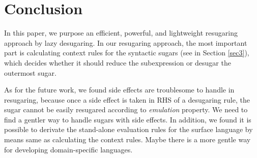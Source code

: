 \section{Conclusion}
\label{sec7}


In this paper, we purpose an efficient, powerful, and lightweight resugaring approach by lazy desugaring.
In our resugaring approach, the most important part is calculating context rules for the syntactic sugars (see in Section \ref{sec3}), which decides whether it should reduce the subexpression or desugar the outermost sugar.



As for the future work, we found side effects are troublesome to handle in resugaring, because once a side effect is taken in RHS of a desugaring rule, the sugar cannot be easily resugared according to \emph{emulation} property. We need to find a gentler way to handle sugars with side effects. In addition, we found it is possible to derivate the stand-alone evaluation rules for the surface language by means same as calculating the context rules. Maybe there is a more gentle way for developing domain-specific languages.
